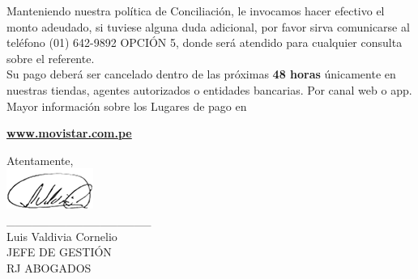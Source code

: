 \noindent Manteniendo nuestra política de Conciliación, le invocamos hacer efectivo el monto adeudado,
si tuviese alguna duda adicional, por favor sirva comunicarse al teléfono (01) 642-9892 OPCIÓN 5,
donde será atendido para cualquier consulta sobre el referente.\\

\noindent Su pago deberá ser cancelado dentro de las próximas \textbf{48 horas} únicamente en nuestras tiendas, agentes autorizados o entidades bancarias. Por canal web o app. Mayor información sobre los Lugares de pago en
\begin{center}
\underline{\textcolor[rgb]{0.00,0.07,1.00}{\textbf{www.movistar.com.pe}}}
\end{center}

\noindent Atentamente,\\
\includegraphics[natwidth=2.831041667cm, natheight=1.322916667cm]{resources/lawyer_signature.png}\\
\_\_\_\_\_\_\_\_\_\_\_\_\_\_\_\_\_\\
{\small Luis Valdivia Cornelio\\
JEFE DE GESTIÓN\\
RJ ABOGADOS}\\










